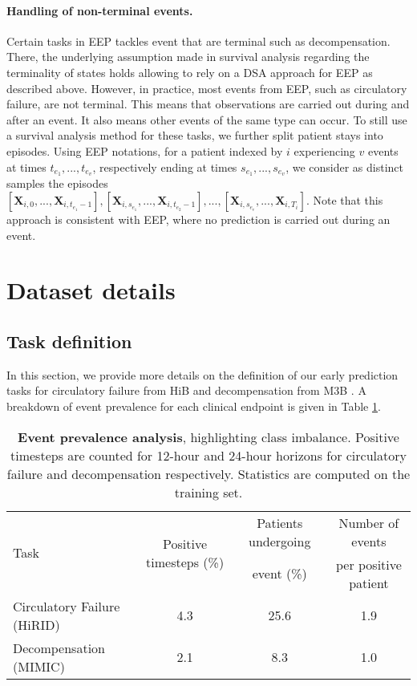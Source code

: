 \documentclass[nohyperref]{article}
\begin{document}
\paragraph{Handling of non-terminal events.} Certain tasks in EEP tackles event that are terminal such as decompensation. There, the underlying assumption made in survival analysis regarding the terminality of states holds allowing to rely on a DSA approach for EEP as described above. However, in practice, most events from EEP, such as circulatory failure, are not terminal. This means that observations are carried out during and after an event. It also means other events of the same type can occur. To still use a survival analysis method for these tasks, we further split patient stays into episodes.
Using EEP notations, for a patient indexed by $i$ experiencing $v$ events at times $t_{e_1}, ..., t_{e_v}$, respectively ending at times $s_{e_1}, .. ., s_{e_v}$, we consider as distinct samples the episodes $[\mathbf{X}_{i,0},..., \mathbf{X}_{i,t_{e_1}-1}],[\mathbf{X}_{i,s_{e_1}},..., \mathbf{X}_{i,t_{e_2}-1}], ..., [\mathbf{X}_{i,s_{e_v}},..., \mathbf{X}_{i,T_i}] $. Note that this approach is consistent with EEP, where no prediction is carried out during an event. 


\section{Dataset details}
\label{appendix:dataset_details}
\subsection{Task definition}
\label{appendix:task definition}

In this section, we provide more details on the definition of our early prediction tasks for {circulatory failure} from HiB \citep{yeche2021} and {decompensation} from M3B \citep{harutyunyan2019multitask}. A breakdown of event prevalence for each clinical endpoint is given in Table \ref{tab:event_prevalence}.

\begin{table}[h]
    \centering
    \caption{\textbf{Event prevalence analysis}, highlighting class imbalance. Positive timesteps are counted for 12-hour and 24-hour horizons for circulatory failure and decompensation respectively. Statistics are computed on the training set.}
    \label{tab:event_prevalence}
\begin{tabular}{lccc}
    \toprule
        \multirow{2}{*}{Task} & \multirow{2}{*}{Positive timesteps (\%)} & Patients undergoing  & Number of events \\
        & & event (\%) & per positive patient\\\midrule
        Circulatory Failure (HiRID) & 4.3 & 25.6 & 1.9 \\
        Decompensation (MIMIC) & 2.1 & 8.3 & 1.0\\
        \bottomrule
    \end{tabular}\end{table}
\end{document}
